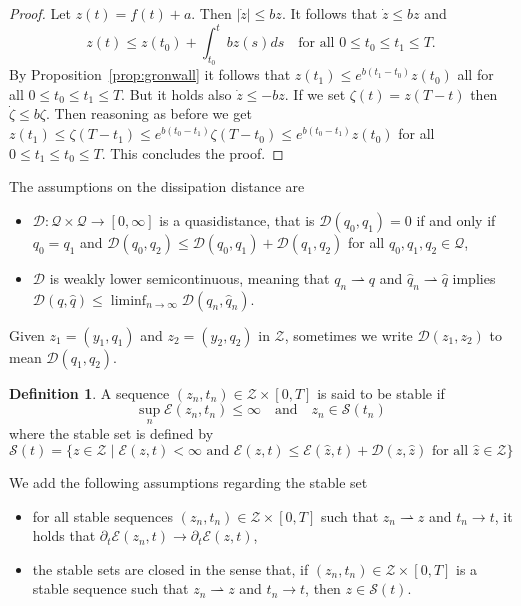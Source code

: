 \documentclass[a4paper,10pt,oneside]{amsbook}
\numberwithin{section}{chapter}
\numberwithin{equation}{chapter}
\theoremstyle{definition}
\newtheorem{defi}[prop]{Definition}
\begin{document}
\begin{proof}
Let $z(t)=f(t)+a$. Then $|\dot z|\le bz$. It follows that $\dot z\le bz$ and
\[
z(t)\le z(t_0)+\int_{t_0}^{t}b z(s)ds\quad\text{for all $0\le t_0\le t_1\le T$}.
\]
By Proposition~\ref{prop:gronwall} it follows that $z(t_1)\le e^{b(t_1-t_0)}z(t_0)$ all for all $0\le t_0\le t_1\le T$. But it holds also $\dot z\le -bz$. If we set $\zeta(t)=z(T-t)$ then $\dot\zeta\le b\zeta$. Then reasoning as before we get $z(t_1)\le\zeta(T-t_1)\le e^{b(t_0-t_1)}\zeta(T-t_0)\le e^{b(t_0-t_1)}z(t_0)$ for all $0\le t_1\le t_0\le T$. This concludes the proof.
\end{proof}
The assumptions on the dissipation distance are
\begin{itemize}[itemsep=0.5em]
\item[($\mathcal{D}$1)] $\mathcal{D}\colon\mathscr{Q}\times\mathscr{Q}\to[0,\infty]$ is a quasidistance, that is $\mathcal{D}(q_0,q_1)=0$ if and only if $q_0=q_1$ and $\mathcal{D}(q_0,q_2)\le\mathcal{D}(q_0,q_1)+\mathcal{D}(q_1,q_2)$ for all $q_0,q_1,q_2\in\mathscr{Q}$,
\item[($\mathcal{D}$2)] $\mathcal{D}$ is weakly lower semicontinuous, meaning that $q_n\rightharpoonup q$ and $\hat{q}_n\rightharpoonup\hat{q}$ implies $\mathcal{D}(q,\hat{q})\le\liminf_{n\to\infty}\mathcal{D}(q_n,\hat{q}_n)$.
\end{itemize}
Given $z_1=(y_1,q_1)$ and $z_2=(y_2,q_2)$ in $\mathscr{Z}$, sometimes we write $\mathcal{D}(z_1,z_2)$ to mean $\mathcal{D}(q_1,q_2)$.
\begin{defi}
A sequence $(z_n,t_n)\in\mathscr{Z}\times[0,T]$ is said to be stable if
\[
\sup_n\mathcal{E}(z_n,t_n)\le\infty\quad\text{and}\quad z_n\in\mathscr{S}(t_n)
\]
where the stable set is defined by
\[
\mathscr{S}(t)=\{z\in\mathscr{Z}\;|\;\text{$\mathcal{E}(z,t)<\infty$ and $\mathcal{E}(z,t)\le\mathcal{E}(\hat{z},t)+\mathcal{D}(z,\hat{z})$ for all $\hat{z}\in\mathscr{Z}$}\}
\]
\end{defi}
We add the following assumptions regarding the stable set
\begin{itemize}[itemsep=0.5em]
\item[(C1)] for all stable sequences $(z_n,t_n)\in\mathscr{Z}\times[0,T]$ such that $z_n\rightharpoonup z$ and $t_n\to t$, it holds that $\partial_t\mathcal{E}(z_n,t)\to\partial_t\mathcal{E}(z,t)$,
\item[(C2)] the stable sets are closed in the sense that, if $(z_n,t_n)\in\mathscr{Z}\times[0,T]$ is a stable sequence such that $z_n\rightharpoonup z$ and $t_n\to t$, then $z\in\mathscr{S}(t)$.
\end{itemize}
\end{document}
